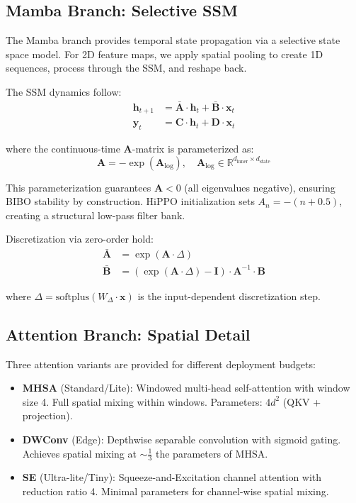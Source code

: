 \documentclass[conference]{IEEEtran}
\begin{document}
\subsection{Mamba Branch: Selective SSM}

The Mamba branch provides temporal state propagation via a selective state space model. For 2D feature maps, we apply spatial pooling to create 1D sequences, process through the SSM, and reshape back.

The SSM dynamics follow:
\begin{align}
\mathbf{h}_{t+1} &= \bar{\mathbf{A}} \cdot \mathbf{h}_t + \bar{\mathbf{B}} \cdot \mathbf{x}_t \label{eq:ssm_state}\\
\mathbf{y}_t &= \mathbf{C} \cdot \mathbf{h}_t + \mathbf{D} \cdot \mathbf{x}_t \label{eq:ssm_output}
\end{align}

where the continuous-time $\mathbf{A}$-matrix is parameterized as:
\begin{equation}
\mathbf{A} = -\exp(\mathbf{A}_{\log}), \quad \mathbf{A}_{\log} \in \mathbb{R}^{d_{\text{inner}} \times d_{\text{state}}}
\label{eq:a_param}
\end{equation}

This parameterization guarantees $\mathbf{A} < 0$ (all eigenvalues negative), ensuring BIBO stability by construction. HiPPO initialization sets $A_n = -(n + 0.5)$, creating a structural low-pass filter bank.

Discretization via zero-order hold:
\begin{align}
\bar{\mathbf{A}} &= \exp(\mathbf{A} \cdot \Delta) \label{eq:zoh_a}\\
\bar{\mathbf{B}} &= (\exp(\mathbf{A} \cdot \Delta) - \mathbf{I}) \cdot \mathbf{A}^{-1} \cdot \mathbf{B}
\end{align}

where $\Delta = \text{softplus}(W_\Delta \cdot \mathbf{x})$ is the input-dependent discretization step.

\subsection{Attention Branch: Spatial Detail}

Three attention variants are provided for different deployment budgets:

\begin{itemize}
\item \textbf{MHSA} (Standard/Lite): Windowed multi-head self-attention with window size 4. Full spatial mixing within windows. Parameters: $4d^2$ (QKV + projection).
\item \textbf{DWConv} (Edge): Depthwise separable convolution with sigmoid gating. Achieves spatial mixing at ${\sim}\frac{1}{3}$ the parameters of MHSA.
\item \textbf{SE} (Ultra-lite/Tiny): Squeeze-and-Excitation channel attention with reduction ratio 4. Minimal parameters for channel-wise spatial mixing.
\end{itemize}
\end{document}
